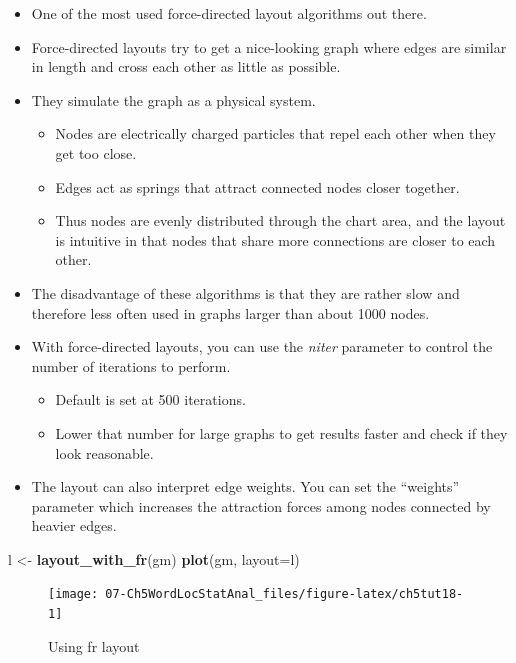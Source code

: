 \documentclass[
]{article}
\newenvironment{Shaded}{\begin{snugshade}}{\end{snugshade}}
\newcommand{\AttributeTok}[1]{\textcolor[rgb]{0.13,0.29,0.53}{#1}}
\newcommand{\FunctionTok}[1]{\textcolor[rgb]{0.13,0.29,0.53}{\textbf{#1}}}
\newcommand{\NormalTok}[1]{#1}
\newcommand{\OtherTok}[1]{\textcolor[rgb]{0.56,0.35,0.01}{#1}}
\providecommand{\tightlist}{%
  \setlength{\itemsep}{0pt}\setlength{\parskip}{0pt}}
\begin{document}
\begin{itemize}
\tightlist
\item
  One of the most used force-directed layout algorithms out there.
\item
  Force-directed layouts try to get a nice-looking graph where edges are similar in length and cross each other as little as possible.
\item
  They simulate the graph as a physical system.

  \begin{itemize}
  \tightlist
  \item
    Nodes are electrically charged particles that repel each other when they get too close.
  \item
    Edges act as springs that attract connected nodes closer together.
  \item
    Thus nodes are evenly distributed through the chart area, and the layout is intuitive in that nodes that share more connections are closer to each other.
  \end{itemize}
\item
  The disadvantage of these algorithms is that they are rather slow and therefore less often used in graphs larger than about 1000 nodes.
\item
  With force-directed layouts, you can use the \emph{niter} parameter to control the number of iterations to perform.

  \begin{itemize}
  \tightlist
  \item
    Default is set at 500 iterations.
  \item
    Lower that number for large graphs to get results faster and check if they look reasonable.
  \end{itemize}
\item
  The layout can also interpret edge weights. You can set the ``weights'' parameter which increases the attraction forces among nodes connected by heavier edges.
\end{itemize}

\begin{Shaded}
\begin{Highlighting}[]
\NormalTok{l }\OtherTok{\textless{}{-}} \FunctionTok{layout\_with\_fr}\NormalTok{(gm)}
\FunctionTok{plot}\NormalTok{(gm, }\AttributeTok{layout=}\NormalTok{l)}
\end{Highlighting}
\end{Shaded}

\begin{figure}

{\centering \texttt{[image: 07-Ch5WordLocStatAnal\_files/figure-latex/ch5tut18-1]} 

}

\caption{Using fr layout}\label{fig:ch5tut18}
\end{figure}
\end{document}
